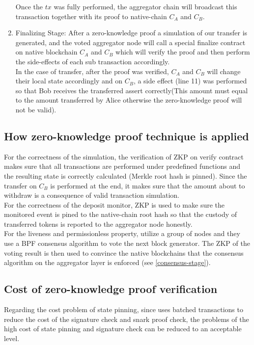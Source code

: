 \documentclass[pageno]{jpaper}
\begin{document}
\begin{enumerate}[leftmargin=*]
\newline
Once the $tx$ was fully performed, the aggregator chain will broadcast this transaction together with its proof to native-chain $C_A$ and $C_B$.\\
\item Finalizing Stage:
After a zero-knowledge proof a simulation of our transfer is generated, and the voted aggregator node will call a special finalize contract on native blockchain $C_A$ and $C_B$ which will verify the proof and then perform the side-effects of each sub transaction accordingly.\\
\newline
In the case of transfer, after the proof was verified, $C_A$ and $C_B$ will change their local state accordingly and on $C_B$, a side effect (line 11) was performed so that Bob receives the transferred assert correctly(This amount must equal to the amount transferred by Alice otherwise the zero-knowledge proof will not be valid).
\end{enumerate}
\subsection{How zero-knowledge proof technique is applied}
For the correctness of the simulation, the verification of ZKP on verify contract makes sure that all transactions are performed under predefined functions and the resulting state is correctly calculated (Merkle root hash is pinned). Since the transfer on $C_B$ is performed at the end, it makes sure that the amount about to withdraw is a consequence of valid transaction simulation.\\
\newline
For the correctness of the deposit monitor, ZKP is used to make sure the monitored event is pined to the native-chain root hash \cite{sidechainzkp} so that the custody of transferred tokens is reported to the aggregator node honestly. \\
\newline
For the liveness and permissionless property, \dprotocol utilize a group of nodes and they use a BPF consensus algorithm to vote the next block generator. The ZKP of the voting result is then used to convince the native blockchains that the consensus algorithm on the aggregator layer is enforced (see \ref{consensus-stage}).

\subsection{Cost of zero-knowledge proof verification}
Regarding the cost problem of state pinning, since \dprotocol uses batched transactions to reduce the cost of the signature check and snark proof check, the problems of the high cost of state pinning and signature check can be reduced to an acceptable level.
\end{document}
